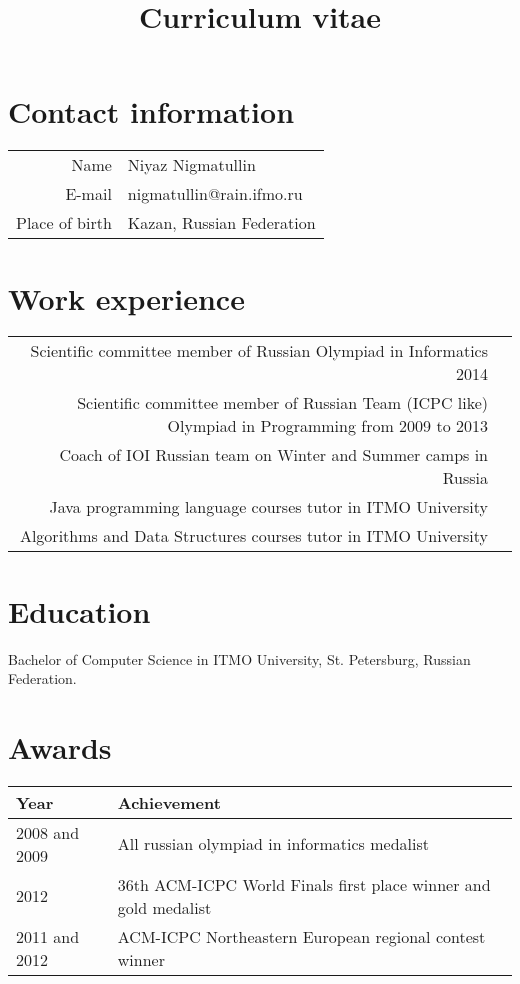 \documentclass[11pt,a4paper,oneside]{article}
\begin{document}
\title{Curriculum vitae}
\date{}        
\maketitle

\section{Contact information}
\begin{center}
\begin{tabular}{r|l}
    Name&Niyaz Nigmatullin \\
    E-mail&nigmatullin@rain.ifmo.ru \\
    Place of birth&Kazan, Russian Federation \\
\end{tabular}
\end{center}

\section{Work experience}
\begin{center}
  \begin{tabular}{rl}
    Scientific committee member of Russian Olympiad in Informatics 2014 \\
    Scientific committee member of Russian Team (ICPC like) Olympiad in Programming from 2009 to 2013 \\
    Coach of IOI Russian team on Winter and Summer camps in Russia \\
    Java programming language courses tutor in ITMO University \\
    Algorithms and Data Structures courses tutor in ITMO University \\
  \end{tabular}
\end{center}

\section{Education}
    Bachelor of Computer Science in ITMO University, St. Petersburg, Russian Federation.

\section{Awards}
\begin{center}
    \begin{tabular}{l|l}
        Year&Achievement \\
        \hline
        2008 and 2009& All russian olympiad in informatics medalist \\
        2012&36th ACM-ICPC World Finals first place winner and gold medalist \\
        2011 and 2012&ACM-ICPC Northeastern European regional contest winner \\
    \end{tabular}
\end{center}
\end{document}

